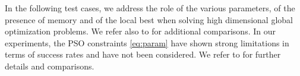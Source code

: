 \documentclass{ims9x6}
\begin{document}
In the following test cases, we address the role of the various parameters, of the presence of memory and of the local best when solving high dimensional global optimization problems. We refer also to \cite{Totzeck2018ANC} for additional comparisons. In our experiments, the PSO constraints \eqref{eq:param} have shown strong limitations in terms of success rates and have not been considered. We refer to \cite{Grassi2021PSO} for further details and comparisons.
 

\end{document}
